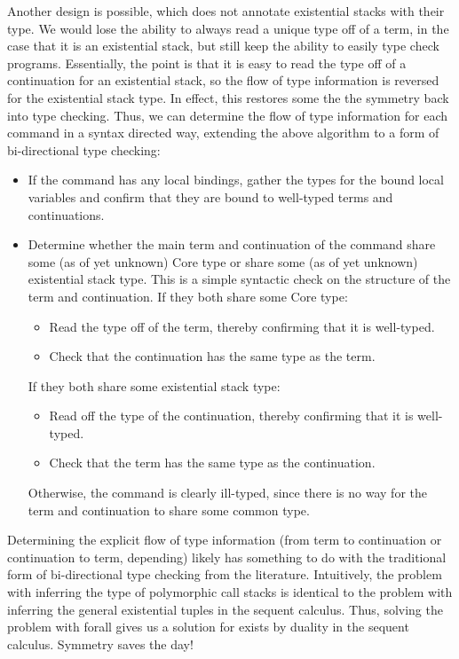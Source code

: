 \documentclass{article}
\begin{document}
Another design is possible, which does not annotate existential stacks with
their type.  We would lose the ability to always read a unique type off of a
term, in the case that it is an existential stack, but still keep the ability to
easily type check programs.  Essentially, the point is that it is easy to read
the type off of a continuation for an existential stack, so the flow of type
information is reversed for the existential stack type.  In effect, this
restores some the the symmetry back into type checking.  Thus, we can determine
the flow of type information for each command in a syntax directed way,
extending the above algorithm to a form of bi-directional type checking:
\begin{itemize}
\item If the command has any local bindings, gather the types for the bound
  local variables and confirm that they are bound to well-typed terms and
  continuations.
\item Determine whether the main term and continuation of the command share some
  (as of yet unknown) Core type or share some (as of yet unknown) existential
  stack type.  This is a simple syntactic check on the structure of the term and
  continuation.  If they both share some Core type:
  \begin{itemize}
  \item Read the type off of the term, thereby confirming that it is well-typed.
  \item Check that the continuation has the same type as the term.
  \end{itemize}
  If they both share some existential stack type:
  \begin{itemize}
  \item Read off the type of the continuation, thereby confirming that it is
    well-typed.
  \item Check that the term has the same type as the continuation.
  \end{itemize}
  Otherwise, the command is clearly ill-typed, since there is no way for the
  term and continuation to share some common type.
\end{itemize}
Determining the explicit flow of type information (from term to continuation or
continuation to term, depending) likely has something to do with the traditional
form of bi-directional type checking from the literature.  Intuitively, the
problem with inferring the type of polymorphic call stacks is identical to the
problem with inferring the general existential tuples in the sequent calculus.
Thus, solving the problem with forall gives us a solution for exists by duality
in the sequent calculus.  Symmetry saves the day!
\end{document}

